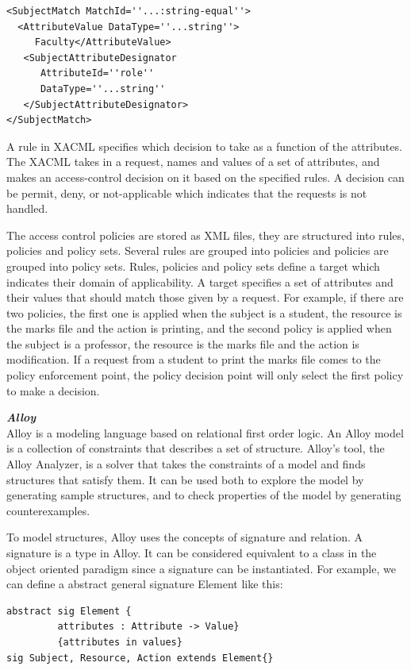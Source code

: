 \documentclass{acm_proc_article-sp}
\begin{document}
\begin{verbatim}
<SubjectMatch MatchId=''...:string-equal''>
  <AttributeValue DataType=''...string''>
     Faculty</AttributeValue>
   <SubjectAttributeDesignator 
      AttributeId=''role''
      DataType=''...string''
   </SubjectAttributeDesignator>
</SubjectMatch>
\end{verbatim}

A rule in XACML specifies which decision to take as a function of the attributes. The XACML takes in a request, names and values of a set of attributes, and makes an access-control decision on it based on the specified rules. A decision can be permit, deny, or not-applicable which indicates that the requests is not handled. 

The access control policies are stored as XML files, they are structured into rules, policies and policy sets. Several rules are grouped into policies and policies are grouped into
policy sets. Rules, policies and policy sets define a target which indicates their domain of applicability. A target specifies a set of attributes and their values that should match those
given by a request. For example, if there are two policies, the first one is applied when the subject is a student, the resource is the marks file and the action is printing, and the second policy is applied
when the subject is a professor, the resource is the marks file and the action is modification. If a request from a student to print the marks file comes to the policy enforcement point, the policy decision point will only select the first policy to make a decision.

\textbf{\emph{Alloy}}\\
Alloy is a modeling language based on relational first order logic. An Alloy model is a collection of constraints that describes a set of structure. Alloy's tool, the Alloy Analyzer, is a solver that takes the constraints of a model and finds structures that satisfy them. It can be used both to explore the model by generating sample structures, and to check properties of the model by generating counterexamples. 

To model structures, Alloy uses the concepts of signature and relation. A signature is a type in Alloy. It can be considered equivalent to a class in the object oriented paradigm since a signature can be instantiated. For example, we can define a abstract general signature Element like this:
 
 \begin{verbatim}
abstract sig Element {
         attributes : Attribute -> Value}
         {attributes in values}
sig Subject, Resource, Action extends Element{}
\end{verbatim}
\end{document}
